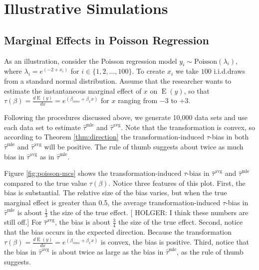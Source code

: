 \documentclass[11pt]{article}
\DeclareMathOperator*{\E}{\text{E}}
\begin{document}
\section*{Illustrative Simulations}

\subsection*{Marginal Effects in Poisson Regression}

As an illustration, consider the Poisson regression model $y_i \sim \text{Poisson}(\lambda_i)$, where $\lambda_i = e^{(-2 + x_i)}$ for $i \in \{1, 2,\ldots, 100\}$.
To create $x_i$ we take $100$ i.i.d.\@ draws from a standard normal distribution.
Assume that the researcher wants to estimate the instantaneous marginal effect of $x$ on $\E(y)$, so that $\tau(\beta) = \frac{d \E (y)}{dx} = e^{(\beta_{cons} + \beta_x x)}$ for $x$ ranging from $-3$ to $+3$.

Following the procedures discussed above, we generate 10,000 data sets and use each data set to estimate $\hat{\tau}^\text{mle}$ and $\hat{\tau}^\text{avg}$.
Note that the transformation is convex, so according to Theorem \ref{thm:direction} the transformation-induced $\tau$-bias in both $\hat{\tau}^\text{mle}$ and $\hat{\tau}^\text{avg}$ will be positive.
The rule of thumb suggests about twice as much bias in $\hat{\tau}^\text{avg}$ as in $\hat{\tau}^\text{mle}$.

Figure \ref{fig:poisson-mcs} shows the transformation-induced $\tau$-bias in $\hat{\tau}^\text{avg}$ and $\hat{\tau}^\text{mle}$ compared to the true value $\tau(\beta)$.
Notice three features of this plot.
First, the bias is substantial.
The relative size of the bias varies, but when the true marginal effect is greater than 0.5, the average transformation-induced $\tau$-bias in $\hat{\tau}^\text{mle}$ is about $\frac{1}{3}$ the size of the true effect.
[{\color{red} HOLGER: I think these numbers are still off.}] For $\hat{\tau}^\text{avg}$, the bias is about $\frac{3}{4}$ the size of the true effect.
Second, notice that the bias occurs in the expected direction.
Because the transformation $\tau(\beta) = \frac{d \E (y)}{dx} = e^{(\beta_{cons} + \beta_x x)}$ is convex, the bias is positive.
Third, notice that the bias in $\hat{\tau}^\text{avg}$ is about twice as large as the bias in $\hat{\tau}^\text{mle}$, as the rule of thumb suggests.
\end{document}
